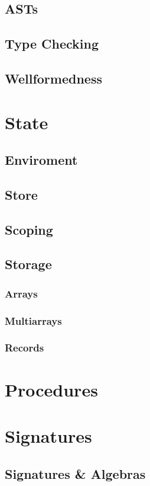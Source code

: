 \subsection*{ASTs}
\subsection*{Type Checking}
\subsection*{Wellformedness}

\section{State}
\subsection*{Enviroment}
\subsection*{Store}
\subsection*{Scoping}
\subsection*{Storage}
\subsubsection*{Arrays}
\subsubsection*{Multiarrays}
\subsubsection*{Records}


\section{Procedures}



\section{Signatures}
\subsection*{Signatures \& Algebras}
